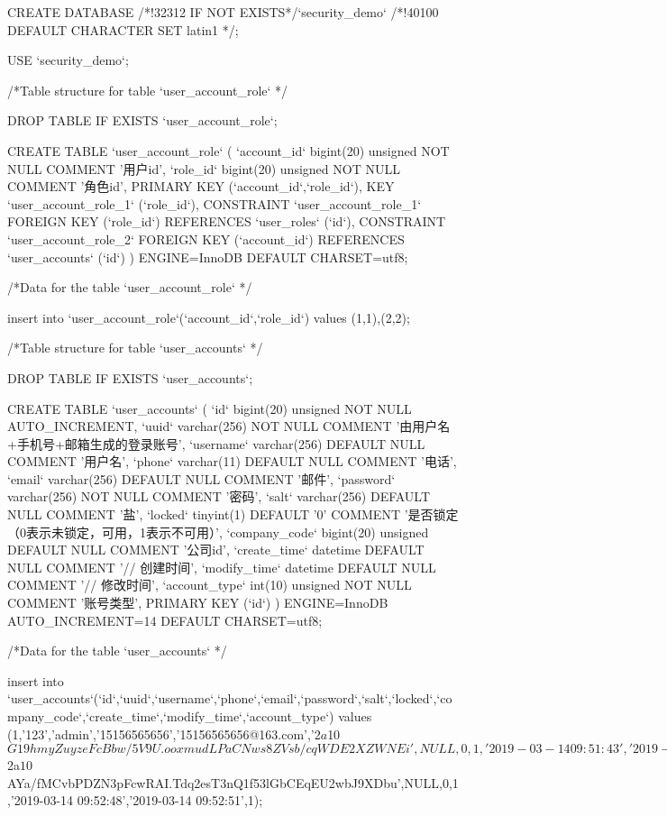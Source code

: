 CREATE DATABASE /*!32312 IF NOT EXISTS*/`security_demo` /*!40100 DEFAULT CHARACTER SET latin1 */;

USE `security_demo`;

/*Table structure for table `user_account_role` */

DROP TABLE IF EXISTS `user_account_role`;

CREATE TABLE `user_account_role` (
  `account_id` bigint(20) unsigned NOT NULL COMMENT '用户id',
  `role_id` bigint(20) unsigned NOT NULL COMMENT '角色id',
  PRIMARY KEY (`account_id`,`role_id`),
  KEY `user_account_role_1` (`role_id`),
  CONSTRAINT `user_account_role_1` FOREIGN KEY (`role_id`) REFERENCES `user_roles` (`id`),
  CONSTRAINT `user_account_role_2` FOREIGN KEY (`account_id`) REFERENCES `user_accounts` (`id`)
) ENGINE=InnoDB DEFAULT CHARSET=utf8;

/*Data for the table `user_account_role` */

insert  into `user_account_role`(`account_id`,`role_id`) values (1,1),(2,2);

/*Table structure for table `user_accounts` */

DROP TABLE IF EXISTS `user_accounts`;

CREATE TABLE `user_accounts` (
  `id` bigint(20) unsigned NOT NULL AUTO_INCREMENT,
  `uuid` varchar(256) NOT NULL COMMENT '由用户名+手机号+邮箱生成的登录账号',
  `username` varchar(256) DEFAULT NULL COMMENT '用户名',
  `phone` varchar(11) DEFAULT NULL COMMENT '电话',
  `email` varchar(256) DEFAULT NULL COMMENT '邮件',
  `password` varchar(256) NOT NULL COMMENT '密码',
  `salt` varchar(256) DEFAULT NULL COMMENT '盐',
  `locked` tinyint(1) DEFAULT '0' COMMENT '是否锁定（0表示未锁定，可用，1表示不可用）',
  `company_code` bigint(20) unsigned DEFAULT NULL COMMENT '公司id',
  `create_time` datetime DEFAULT NULL COMMENT '// 创建时间',
  `modify_time` datetime DEFAULT NULL COMMENT '// 修改时间',
  `account_type` int(10) unsigned NOT NULL COMMENT '账号类型',
  PRIMARY KEY (`id`)
) ENGINE=InnoDB AUTO_INCREMENT=14 DEFAULT CHARSET=utf8;

/*Data for the table `user_accounts` */

insert  into `user_accounts`(`id`,`uuid`,`username`,`phone`,`email`,`password`,`salt`,`locked`,`company_code`,`create_time`,`modify_time`,`account_type`) values (1,'123','admin','15156565656','15156565656@163.com','$2a$10$G19hmyZuyzeFcBbw/5V9U.ooxmudLPaCNws8ZVsb/cqWDE2XZWNEi',NULL,0,1,'2019-03-14 09:51:43','2019-03-14 09:51:47',0),(2,'123','user','12155556666','12155556666@163.com','$2a$10$AYa/fMCvbPDZN3pFcwRAI.Tdq2esT3nQ1f53lGbCEqEU2wbJ9XDbu',NULL,0,1,'2019-03-14 09:52:48','2019-03-14 09:52:51',1);

